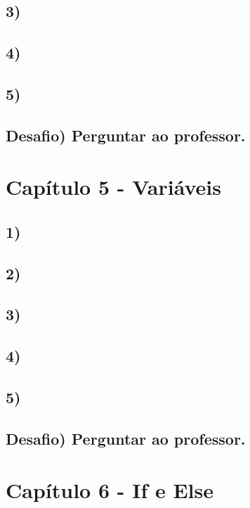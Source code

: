     \subsection*{3)}
    
    \subsection*{4)}
    
    \subsection*{5)}
    
    \subsection*{Desafio) Perguntar ao professor.}

\section*{Capítulo 5 - Variáveis}

    \subsection*{1)}
    
    \subsection*{2)}
    
    \subsection*{3)}
    
    \subsection*{4)}
    
    \subsection*{5)}
    
    \subsection*{Desafio) Perguntar ao professor.}

\section{Capítulo 6 - If e Else}

